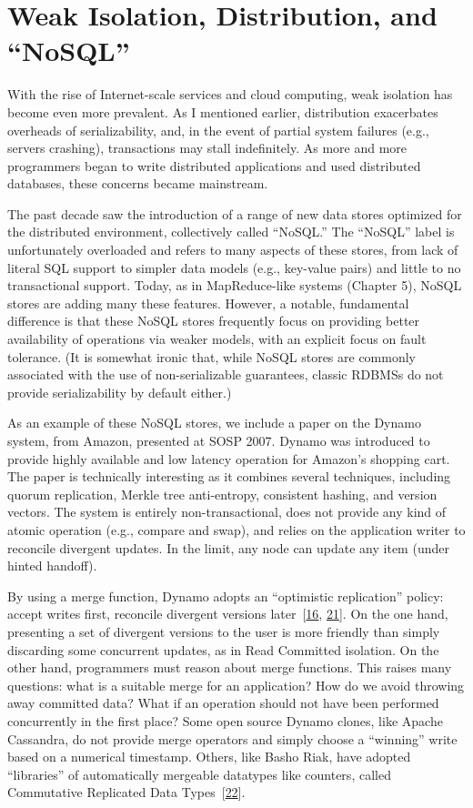 \documentclass[b5paper,11pt,twoside,openright]{book}
\newcommand\Section[2]{
  \hypertarget{#1}{
    \section{#2}
  }
}
\begin{document}
\Section{weak-isolation-distribution-and-nosql}{%
Weak Isolation, Distribution, and ``NoSQL''
}

With the rise of Internet-scale services and cloud computing, weak
isolation has become even more prevalent. As I mentioned earlier,
distribution exacerbates overheads of serializability, and, in the event
of partial system failures (e.g., servers crashing), transactions may
stall indefinitely. As more and more programmers began to write
distributed applications and used distributed databases, these concerns
became mainstream.

The past decade saw the introduction of a range of new data stores
optimized for the distributed environment, collectively called
``NoSQL.'' The ``NoSQL'' label is unfortunately overloaded and refers to
many aspects of these stores, from lack of literal SQL support to
simpler data models (e.g., key-value pairs) and little to no
transactional support. Today, as in MapReduce-like systems (Chapter 5),
NoSQL stores are adding many these features. However, a notable,
fundamental difference is that these NoSQL stores frequently focus on
providing better availability of operations via weaker models, with an
explicit focus on fault tolerance. (It is somewhat ironic that, while
NoSQL stores are commonly associated with the use of non-serializable
guarantees, classic RDBMSs do not provide serializability by default
either.)

As an example of these NoSQL stores, we include a paper on the Dynamo
system, from Amazon, presented at SOSP 2007. Dynamo was introduced to
provide highly available and low latency operation for Amazon's shopping
cart. The paper is technically interesting as it combines several
techniques, including quorum replication, Merkle tree anti-entropy,
consistent hashing, and version vectors. The system is entirely
non-transactional, does not provide any kind of atomic operation (e.g.,
compare and swap), and relies on the application writer to reconcile
divergent updates. In the limit, any node can update any item (under
hinted handoff).

By using a merge function, Dynamo adopts an ``optimistic replication''
policy: accept writes first, reconcile divergent versions
later~{{[}\protect\hyperlink{ref-gray-dangers}{16},
  \protect\hyperlink{ref-optimistic}{21}{]}}. On the one hand, presenting
a set of divergent versions to the user is more friendly than simply
discarding some concurrent updates, as in Read Committed isolation. On
the other hand, programmers must reason about merge functions. This
raises many questions: what is a suitable merge for an application? How
do we avoid throwing away committed data? What if an operation should
not have been performed concurrently in the first place? Some open
source Dynamo clones, like Apache Cassandra, do not provide merge
operators and simply choose a ``winning'' write based on a numerical
timestamp. Others, like Basho Riak, have adopted ``libraries'' of
automatically mergeable datatypes like counters, called Commutative
Replicated Data Types~{{[}\protect\hyperlink{ref-crdt}{22}{]}}.
\end{document}
